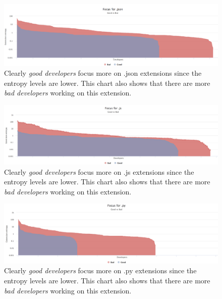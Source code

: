 \begin{figure}[htpb]
  \centering
  \includegraphics[width=1\textwidth]{figures/json_log}
  \caption[Focus Chart for .json]{Clearly \textit{good developers} focus more on .json extensions since the entropy levels are lower. This chart also shows that there are more \textit{bad developers} working on this extension.} \label{fig:json_log_appendix}
\end{figure}

\begin{figure}[htpb]
  \centering
  \includegraphics[width=1\textwidth]{figures/js_log}
  \caption[Focus Chart for .js]{Clearly \textit{good developers} focus more on .js extensions since the entropy levels are lower. This chart also shows that there are more \textit{bad developers} working on this extension.} \label{fig:js_log_appendix}
\end{figure}

\begin{figure}[htpb]
  \centering
  \includegraphics[width=1\textwidth]{figures/py_log}
  \caption[Focus Chart for .py]{Clearly \textit{good developers} focus more on .py extensions since the entropy levels are lower. This chart also shows that there are more \textit{bad developers} working on this extension.} \label{fig:py_log_appendix}
\end{figure}

